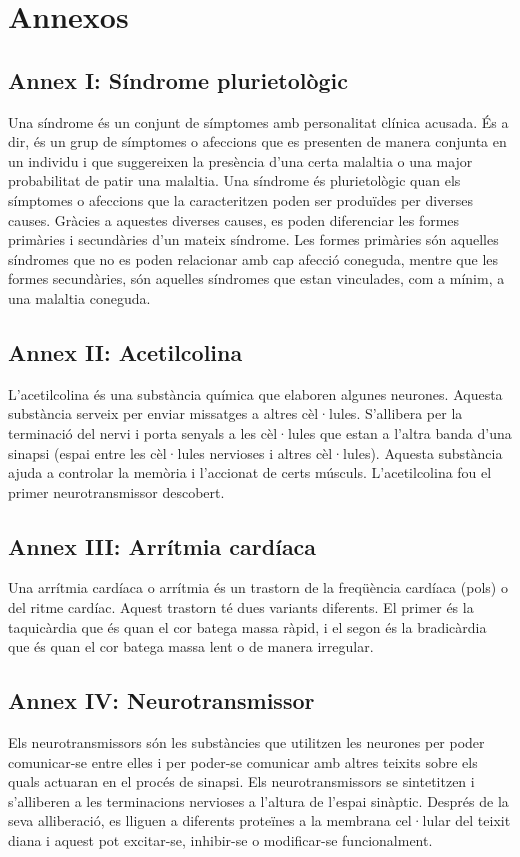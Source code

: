 \documentclass[a4paper,12pt]{article}
\begin{document}
\section*{Annexos}

\subsection*{Annex I: Síndrome plurietològic}
Una síndrome és un conjunt de símptomes amb personalitat clínica acusada. És a dir, és un grup de símptomes o afeccions que es presenten de manera conjunta en un individu i que suggereixen la presència d'una certa malaltia o una major probabilitat de patir una malaltia. Una síndrome és plurietològic quan els símptomes o afeccions que la caracteritzen poden ser produïdes per diverses causes. Gràcies a aquestes diverses causes, es poden diferenciar les formes primàries i secundàries d'un mateix síndrome. Les formes primàries són aquelles síndromes que no es poden relacionar amb cap afecció coneguda, mentre que les formes secundàries, són aquelles síndromes que estan vinculades, com a mínim, a una malaltia coneguda.
\subsection*{Annex II: Acetilcolina}
L'acetilcolina és una substància química que elaboren algunes neurones. Aquesta substància serveix per enviar missatges a altres cèl·lules. S'allibera per la terminació del nervi i porta senyals a les cèl·lules que estan a l'altra banda d'una sinapsi (espai entre les cèl·lules nervioses i altres cèl·lules). Aquesta substància ajuda a controlar la memòria i l'accionat de certs músculs. L'acetilcolina fou el primer neurotransmissor descobert.
\subsection*{Annex III: Arrítmia cardíaca}
Una arrítmia cardíaca o arrítmia és un trastorn de la freqüència cardíaca (pols) o del ritme cardíac. Aquest trastorn té dues variants diferents. El primer és la taquicàrdia que és quan el cor batega massa ràpid, i el segon és la bradicàrdia que és quan el cor batega massa lent o de manera irregular.
\subsection*{Annex IV: Neurotransmissor}
Els neurotransmissors són les substàncies que utilitzen les neurones per poder comunicar-se entre elles i per poder-se comunicar amb altres teixits sobre els quals actuaran en el procés de sinapsi. Els neurotransmissors se sintetitzen i s'alliberen a les terminacions nervioses a l'altura de l'espai sinàptic. Després de la seva alliberació, es lliguen a diferents proteïnes a la membrana cel·lular del teixit diana i aquest pot excitar-se, inhibir-se o modificar-se funcionalment.
\end{document}
